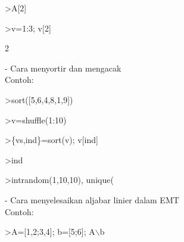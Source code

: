\documentclass[a4paper,10pt]{article}
\begin{document}
\begin{eulernotebook}
\begin{eulercomment}
\begin{eulercomment}
\begin{eulerprompt}
>A[2]
\end{eulerprompt}
\begin{euleroutput}
  [4,  5,  6]
\end{euleroutput}
\begin{eulerprompt}
>v=1:3; v[2]
\end{eulerprompt}
\begin{euleroutput}
  2
\end{euleroutput}
\begin{eulercomment}
- Cara menyortir dan mengacak\\
Contoh:
\end{eulercomment}
\begin{eulerprompt}
>sort([5,6,4,8,1,9])
\end{eulerprompt}
\begin{euleroutput}
  [1,  4,  5,  6,  8,  9]
\end{euleroutput}
\begin{eulerprompt}
>v=shuffle(1:10)
\end{eulerprompt}
\begin{euleroutput}
  [4,  7,  1,  5,  9,  8,  6,  3,  10,  2]
\end{euleroutput}
\begin{eulerprompt}
>\{vs,ind\}=sort(v); v[ind]
\end{eulerprompt}
\begin{euleroutput}
  [1,  2,  3,  4,  5,  6,  7,  8,  9,  10]
\end{euleroutput}
\begin{eulerprompt}
>ind
\end{eulerprompt}
\begin{euleroutput}
  [3,  10,  8,  1,  4,  7,  2,  6,  5,  9]
\end{euleroutput}
\begin{eulerprompt}
>intrandom(1,10,10), unique(%
\end{eulerprompt}
\begin{euleroutput}
  [3,  6,  8,  10,  8,  5,  5,  9,  4,  7]
  [3,  4,  5,  6,  7,  8,  9,  10]
\end{euleroutput}
\begin{eulercomment}
- Cara menyelesaikan aljabar linier dalam EMT\\
Contoh:
\end{eulercomment}
\begin{eulerprompt}
>A=[1,2;3,4]; b=[5;6]; A\(\backslash\)b
\end{eulerprompt}
\begin{euleroutput}

\end{euleroutput}
\end{eulercomment}
\end{eulercomment}
\end{eulernotebook}
\end{document}
